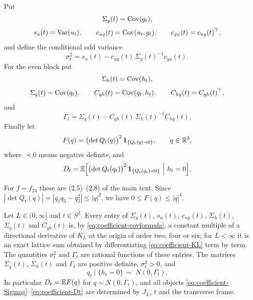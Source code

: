 \begin{definition}\label{def:coefficient-cov}
Put
\begin{equation}\label{eq:coefficient-Sigmag}
\Sigma_g(t)=\operatorname{Cov}(g_t),
\end{equation}
\begin{equation}\label{eq:coefficient-su}
s_u(t)=\operatorname{Var}(u_t),\qquad c_{ug}(t)=\operatorname{Cov}(u_t,g_t),\qquad c_{gu}(t)=c_{ug}(t)^{\top},
\end{equation}
and define the conditional odd variance
\begin{equation}\label{eq:coefficient-sigma}
\sigma_t^2=s_u(t)-c_{ug}(t)\,\Sigma_g(t)^{-1}c_{gu}(t).
\end{equation}
For the even block put
\begin{equation}\label{eq:coefficient-Sigmah}
\Sigma_h(t)=\operatorname{Cov}(h_t),
\end{equation}
\begin{equation}\label{eq:coefficient-Sigmaq}
\Sigma_q(t)=\operatorname{Cov}(q_t),\qquad C_{qh}(t)=\operatorname{Cov}(q_t,h_t),\qquad C_{hq}(t)=C_{qh}(t)^{\top},
\end{equation}
and
\begin{equation}\label{eq:coefficient-Gamma}
\Gamma_t=\Sigma_q(t)-C_{qh}(t)\,\Sigma_h(t)^{-1}C_{hq}(t).
\end{equation}
Finally let
\begin{equation}\label{eq:coefficient-F}
F(q)=\bigl(\det Q_t(q)\bigr)^2\,\mathbf 1_{\{Q_t(q)\prec0\}},\qquad q\in\mathbb R^3,
\end{equation}
where $\prec0$ means negative definite, and
\begin{equation}\label{eq:coefficient-Dt}
D_t=\E\Bigl[\bigl(\det Q_t(q_t)\bigr)^2\,\ind_{\{Q_t(q_t)\prec0\}}\ \Big|\ h_t=0\Bigr].
\end{equation}
\end{definition}

For $f=f_{24}$ these are (2.5)--(2.8) of the main text. Since $|\det Q_t(q)|=|q_1q_3-q_2^2|\le|q|^2$, we have $0\le F(q)\le|q|^4$.

\begin{lemma}\label{lem:coefficient-posdef}
Let $L\in(0,\infty]$ and $t\in S^2$. Every entry of $\Sigma_g(t)$, $s_u(t)$, $c_{ug}(t)$, $\Sigma_h(t)$, $\Sigma_q(t)$ and $C_{qh}(t)$ is, by \eqref{eq:coefficient-covformula}, a constant multiple of a directional derivative of $K_L$ at the origin of order two, four or six; for $L<\infty$ it is an exact lattice sum obtained by differentiating \eqref{eq:coefficient-KL} term by term. The quantities $\sigma_t^2$ and $\Gamma_t$ are rational functions of these entries. The matrices $\Sigma_g(t)$, $\Sigma_h(t)$ and $\Gamma_t$ are positive definite, $\sigma_t^2>0$, and
\begin{equation}\label{eq:coefficient-qcond}
q_t\mid\{h_t=0\}\ \sim\ N(0,\Gamma_t).
\end{equation}
In particular $D_t=\mathbb E F(q)$ for $q\sim N(0,\Gamma_t)$, and all objects \eqref{eq:coefficient-Sigmag}--\eqref{eq:coefficient-Dt} are determined by $J_L$, $t$ and the transverse frame.
\end{lemma}

